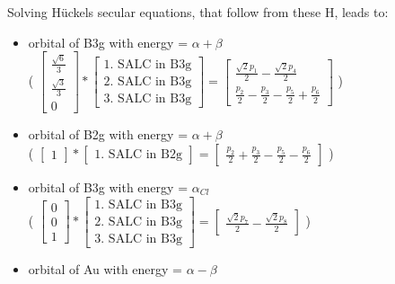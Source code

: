 \documentclass[12pt,a4paper]{article}
\begin{document}
Solving Hückels secular equations, that follow from these H, leads to:
\begin{itemize}
\item orbital of B3g with energy = $\alpha + \beta$ \\
                            ( $\left[\begin{matrix}\frac{\sqrt{6}}{3}\\\frac{\sqrt{3}}{3}\\0\end{matrix}\right] * \left[\begin{array}{c}\text{1. SALC in B3g} \\ \text{2. SALC in B3g} \\ \text{3. SALC in B3g}\end{array}\right] = \left[\begin{matrix}\frac{\sqrt{2} p_{1}}{2} - \frac{\sqrt{2} p_{4}}{2}\\\frac{p_{2}}{2} - \frac{p_{3}}{2} - \frac{p_{5}}{2} + \frac{p_{6}}{2}\end{matrix}\right] $ )
\item orbital of B2g with energy = $\alpha + \beta$ \\
                            ( $\left[\begin{matrix}1\end{matrix}\right] * \left[\begin{array}{c}\text{1. SALC in B2g}\end{array}\right] = \left[\begin{matrix}\frac{p_{2}}{2} + \frac{p_{3}}{2} - \frac{p_{5}}{2} - \frac{p_{6}}{2}\end{matrix}\right] $ )
\item orbital of B3g with energy = $\alpha_{Cl}$ \\
                            ( $\left[\begin{matrix}0\\0\\1\end{matrix}\right] * \left[\begin{array}{c}\text{1. SALC in B3g} \\ \text{2. SALC in B3g} \\ \text{3. SALC in B3g}\end{array}\right] = \left[\begin{matrix}\frac{\sqrt{2} p_{7}}{2} - \frac{\sqrt{2} p_{8}}{2}\end{matrix}\right] $ )
\item orbital of Au with energy = $\alpha - \beta$ \\

\end{itemize}
\end{document}
